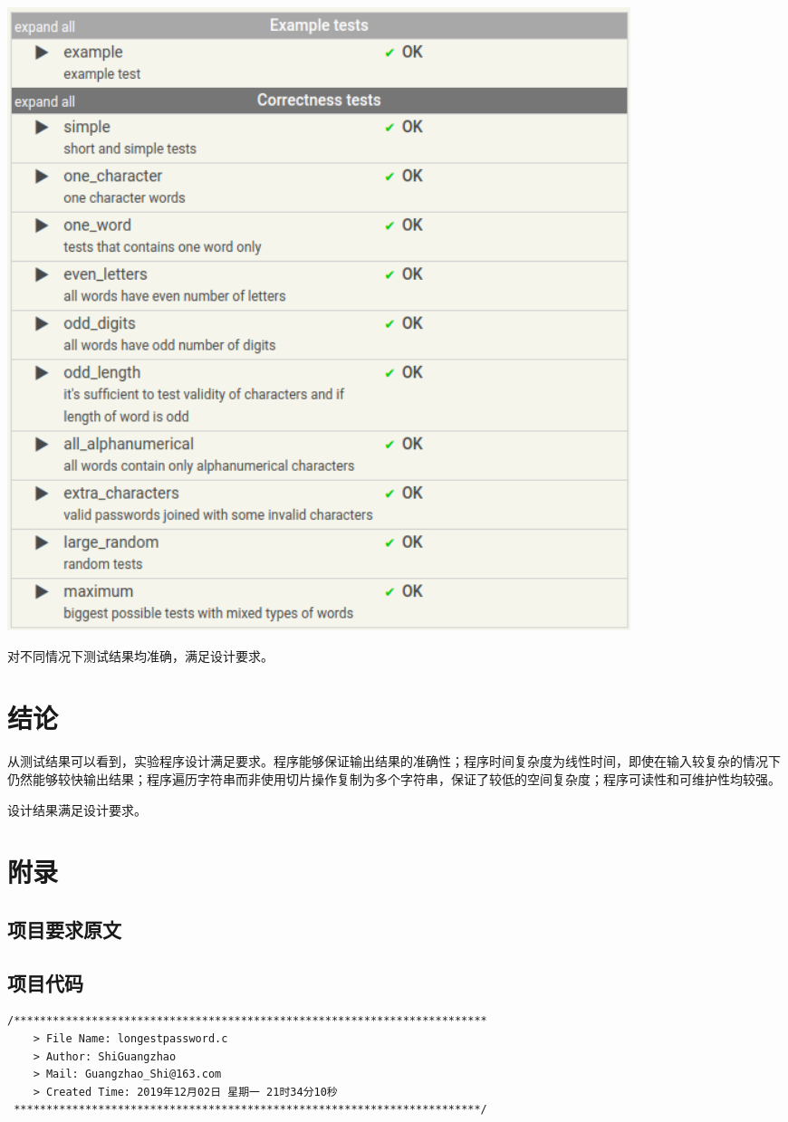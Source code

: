 \begin{spacing}{1.5}
\begin{center}
\includegraphics[width=0.8\textwidth]{./test_result.png}
\end{center}

    对不同情况下测试结果均准确，满足设计要求。

    \section{结论}
    从测试结果可以看到，实验程序设计满足要求。程序能够保证输出结果的准确性；程序时间复杂度为线性时间，即使在输入较复杂的情况下仍然能够较快输出结果；程序遍历字符串而非使用切片操作复制为多个字符串，保证了较低的空间复杂度；程序可读性和可维护性均较强。

    设计结果满足设计要求。

    \section{附录}
    \subsection{项目要求原文}
    

    \subsection{项目代码}
\begin{lstlisting}
/*************************************************************************
    > File Name: longestpassword.c
    > Author: ShiGuangzhao
    > Mail: Guangzhao_Shi@163.com 
    > Created Time: 2019年12月02日 星期一 21时34分10秒
 ************************************************************************/


\end{lstlisting}
\end{spacing}
